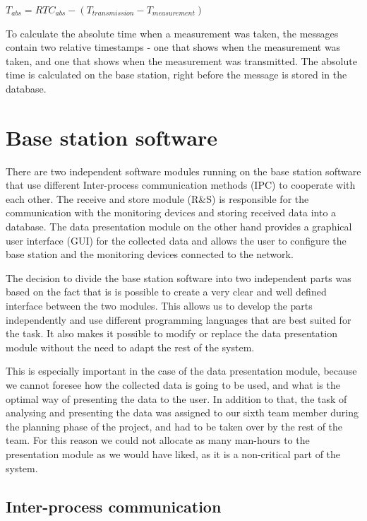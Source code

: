 \begin{center}
\begin{math}
T_{abs} = RTC_{abs}- (T_{transmission} - T_{measurement})
\end{math}
\end{center}

To calculate the absolute time when a measurement was taken, the messages contain two relative timestamps - one that shows when the measurement was taken, and one that shows when the measurement was transmitted. The absolute time is calculated on the base station, right before the message is stored in the database.


\section{Base station software}
There are two independent software modules running on the base station software that use different Inter-process communication methods (IPC) to cooperate with each other. The receive and store module (R\&S) is responsible for the communication with the monitoring devices and storing received data into a database. The data presentation module on the other hand provides a graphical user interface (GUI) for the collected data and allows the user to configure the base station and the monitoring devices connected to the network.

The decision to divide the base station software into two independent parts was based on the fact that is is possible to create a very clear and well defined interface between the two modules. This allows us to develop the parts independently and use different programming languages that are best suited for the task. It also makes it possible to modify or replace the data presentation module without the need to adapt the rest of the system.

This is especially important in the case of the data presentation module, because we cannot foresee how the collected data is going to be used, and what is the optimal way of presenting the data to the user. In addition to that, the task of analysing and presenting the data was assigned to our sixth team member during the planning phase of the project, and had to be taken over by the rest of the team. For this reason we could not allocate as many man-hours to the presentation module as we would have liked, as it is a non-critical part of the system.

\subsection{Inter-process communication}
